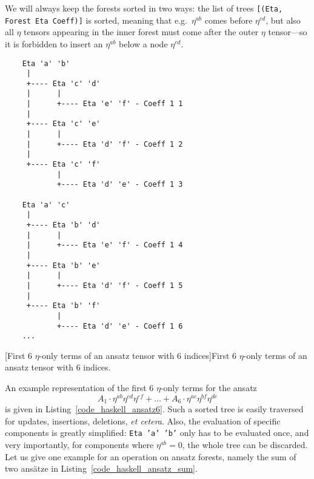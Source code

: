 We will always keep the forests sorted in two ways: the list of trees \texttt{[(Eta, Forest Eta Coeff)]} is sorted, meaning that e.g.\ $\eta^{ab}$ comes before $\eta^{cd}$, but also all $\eta$ tensors appearing in the inner forest must come after the outer $\eta$ tensor---so it is forbidden to insert an $\eta^{ab}$ below a node $\eta^{cd}$.
\begin{code}
  \begin{verbatim}
    Eta 'a' 'b'
     |
     +---- Eta 'c' 'd'
     |      |
     |      +---- Eta 'e' 'f' - Coeff 1 1
     |
     +---- Eta 'c' 'e'
     |      |
     |      +---- Eta 'd' 'f' - Coeff 1 2
     |
     +---- Eta 'c' 'f'
            |
            +---- Eta 'd' 'e' - Coeff 1 3

    Eta 'a' 'c'
     |
     +---- Eta 'b' 'd'
     |      |
     |      +---- Eta 'e' 'f' - Coeff 1 4
     |
     +---- Eta 'b' 'e'
     |      |
     |      +---- Eta 'd' 'f' - Coeff 1 5
     |
     +---- Eta 'b' 'f'
            |
            +---- Eta 'd' 'e' - Coeff 1 6
    ...
  \end{verbatim}
  [First 6 $\eta$-only terms of an ansatz tensor with 6 indices]{First 6 $\eta$-only terms of an ansatz tensor with 6 indices.}
  \label{code_haskell_ansatz6}
\end{code}
An example representation of the first 6 $\eta$-only terms for the ansatz
\begin{equation}
  A_1 \cdot \eta^{ab} \eta^{cd} \eta^{ef} + \dots + A_6 \cdot \eta^{ac} \eta^{bf} \eta^{de}
\end{equation}
is given in Listing~\ref{code_haskell_ansatz6}. Such a sorted tree is easily traversed for updates, insertions, deletions, \emph{et cetera}. Also, the evaluation of specific components is greatly simplified: \texttt{Eta 'a' 'b'} only has to be evaluated once, and very importantly, for components where $\eta^{ab} = 0$, the whole tree can be discarded. Let us give one example for an operation on ansatz forests, namely the sum of two ansätze in Listing~\ref{code_haskell_ansatz_sum}.
